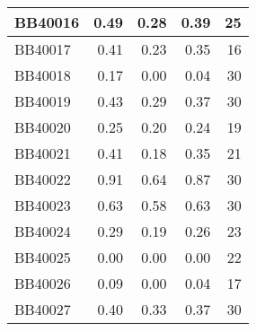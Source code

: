 \begin{longtable}{|l|r|r|r||r|}
	\hline
	BB40016 & \cellcolor[rgb]{ .988,  1,  .992}0.49 & \cellcolor[rgb]{ .384,  .745,  .478}0.28 & \cellcolor[rgb]{ .714,  .882,  .761}0.39 & \cellcolor[rgb]{ .976,  .51,  .518}25 \\
	\hline
	BB40017 & \cellcolor[rgb]{ .988,  1,  .992}0.41 & \cellcolor[rgb]{ .384,  .745,  .478}0.23 & \cellcolor[rgb]{ .769,  .906,  .808}0.35 & \cellcolor[rgb]{ .98,  .682,  .694}16 \\
	\hline
	BB40018 & \cellcolor[rgb]{ .988,  1,  .992}0.17 & \cellcolor[rgb]{ .384,  .745,  .478}0.00 & \cellcolor[rgb]{ .545,  .812,  .612}0.04 & \cellcolor[rgb]{ .973,  .412,  .42}30 \\
	\hline
	BB40019 & \cellcolor[rgb]{ .988,  1,  .992}0.43 & \cellcolor[rgb]{ .384,  .745,  .478}0.29 & \cellcolor[rgb]{ .725,  .886,  .769}0.37 & \cellcolor[rgb]{ .973,  .412,  .42}30 \\
	\hline
	BB40020 & \cellcolor[rgb]{ .988,  1,  .992}0.25 & \cellcolor[rgb]{ .384,  .745,  .478}0.20 & \cellcolor[rgb]{ .922,  .973,  .937}0.24 & \cellcolor[rgb]{ .98,  .624,  .635}19 \\
	\hline
	BB40021 & \cellcolor[rgb]{ .988,  1,  .992}0.41 & \cellcolor[rgb]{ .384,  .745,  .478}0.18 & \cellcolor[rgb]{ .831,  .933,  .859}0.35 & \cellcolor[rgb]{ .98,  .588,  .596}21 \\
	\hline
	BB40022 & \cellcolor[rgb]{ .988,  1,  .992}0.91 & \cellcolor[rgb]{ .384,  .745,  .478}0.64 & \cellcolor[rgb]{ .898,  .961,  .918}0.87 & \cellcolor[rgb]{ .973,  .412,  .42}30 \\
	\hline
	BB40023 & \cellcolor[rgb]{ .988,  1,  .992}0.63 & \cellcolor[rgb]{ .384,  .745,  .478}0.58 & \cellcolor[rgb]{ .965,  .988,  .973}0.63 & \cellcolor[rgb]{ .973,  .412,  .42}30 \\
	\hline
	BB40024 & \cellcolor[rgb]{ .988,  1,  .992}0.29 & \cellcolor[rgb]{ .384,  .745,  .478}0.19 & \cellcolor[rgb]{ .82,  .929,  .847}0.26 & \cellcolor[rgb]{ .976,  .549,  .557}23 \\
	\hline
	BB40025 & \cellcolor[rgb]{ .988,  1,  .992}0.00 & \cellcolor[rgb]{ .988,  1,  .992}0.00 & \cellcolor[rgb]{ .988,  1,  .992}0.00 & \cellcolor[rgb]{ .98,  .569,  .576}22 \\
	\hline
	BB40026 & \cellcolor[rgb]{ .988,  1,  .992}0.09 & \cellcolor[rgb]{ .384,  .745,  .478}0.00 & \cellcolor[rgb]{ .655,  .859,  .71}0.04 & \cellcolor[rgb]{ .98,  .663,  .675}17 \\
	\hline
	BB40027 & \cellcolor[rgb]{ .988,  1,  .992}0.40 & \cellcolor[rgb]{ .384,  .745,  .478}0.33 & \cellcolor[rgb]{ .694,  .875,  .741}0.37 & \cellcolor[rgb]{ .973,  .412,  .42}30 \\

\end{longtable}
